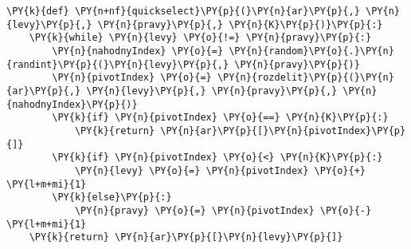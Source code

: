 \begin{Verbatim}[commandchars=\\\{\}]
\PY{k}{def} \PY{n+nf}{quickselect}\PY{p}{(}\PY{n}{ar}\PY{p}{,} \PY{n}{levy}\PY{p}{,} \PY{n}{pravy}\PY{p}{,} \PY{n}{K}\PY{p}{)}\PY{p}{:}
	\PY{k}{while} \PY{n}{levy} \PY{o}{!=} \PY{n}{pravy}\PY{p}{:}
		\PY{n}{nahodnyIndex} \PY{o}{=} \PY{n}{random}\PY{o}{.}\PY{n}{randint}\PY{p}{(}\PY{n}{levy}\PY{p}{,} \PY{n}{pravy}\PY{p}{)}
		\PY{n}{pivotIndex} \PY{o}{=} \PY{n}{rozdelit}\PY{p}{(}\PY{n}{ar}\PY{p}{,} \PY{n}{levy}\PY{p}{,} \PY{n}{pravy}\PY{p}{,} \PY{n}{nahodnyIndex}\PY{p}{)}
		\PY{k}{if} \PY{n}{pivotIndex} \PY{o}{==} \PY{n}{K}\PY{p}{:}
			\PY{k}{return} \PY{n}{ar}\PY{p}{[}\PY{n}{pivotIndex}\PY{p}{]}
		\PY{k}{if} \PY{n}{pivotIndex} \PY{o}{<} \PY{n}{K}\PY{p}{:}
			\PY{n}{levy} \PY{o}{=} \PY{n}{pivotIndex} \PY{o}{+} \PY{l+m+mi}{1}
		\PY{k}{else}\PY{p}{:}
			\PY{n}{pravy} \PY{o}{=} \PY{n}{pivotIndex} \PY{o}{-} \PY{l+m+mi}{1}
	\PY{k}{return} \PY{n}{ar}\PY{p}{[}\PY{n}{levy}\PY{p}{]}
\end{Verbatim}
